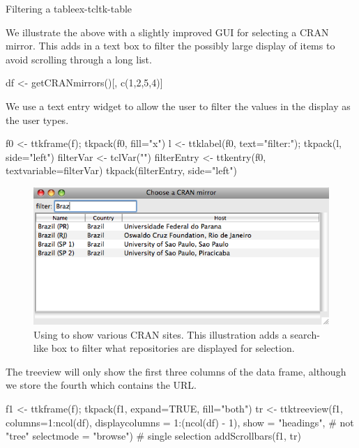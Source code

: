 \begin{example}{Filtering a table}{ex-tcltk-table}

We illustrate the above with a slightly improved GUI for selecting a CRAN mirror. This adds in a text box to filter the possibly large display of items to avoid scrolling through a long list. 
\begin{Schunk}
\begin{Sinput}
 df <- getCRANmirrors()[, c(1,2,5,4)]
\end{Sinput}
\end{Schunk}


We use a text entry widget to allow the user to filter the values in the display as the user types.
\begin{Schunk}
\begin{Sinput}
 f0 <- ttkframe(f); tkpack(f0, fill="x")
 l <- ttklabel(f0, text="filter:"); tkpack(l, side="left")
 filterVar <- tclVar("")
 filterEntry <- ttkentry(f0, textvariable=filterVar)
 tkpack(filterEntry, side="left")
\end{Sinput}
\end{Schunk}

\begin{figure}
  \centering
  \includegraphics[width=.8\textwidth]{fig-tcltk-filter-table.png}
  \caption{Using  to show various CRAN sites. This
    illustration adds a search-like box to filter what repositories
    are displayed for selection.}
  \label{fig:fig-tcltk-filter-table}
\end{figure}


The treeview  will only show the first three columns of the data frame, although we store the fourth which contains the URL.
\begin{Schunk}
\begin{Sinput}
 f1 <- ttkframe(f); tkpack(f1, expand=TRUE, fill="both")
 tr <- ttktreeview(f1, columns=1:ncol(df), 
                   displaycolumns = 1:(ncol(df) - 1), 
                   show = "headings",     # not "tree" 
                   selectmode = "browse") # single selection
 addScrollbars(f1, tr)
\end{Sinput}
\end{Schunk}


\end{example}
